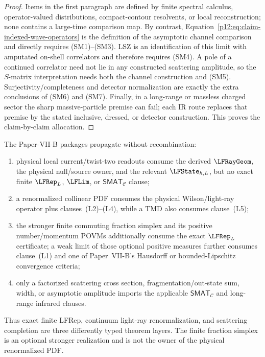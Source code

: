 \documentclass[12pt,a4paper]{article}
\begin{document}
\begin{proof}
Items in the first paragraph are defined by finite spectral calculus,
operator-valued distributions, compact-contour resolvents, or local
reconstruction; none contains a large-time comparison map.  By contrast,
Equation~\eqref{p12:eq:claim-indexed-wave-operators} is the definition of the
asymptotic channel comparison and directly requires \textnormal{(SM1)--(SM3)}.
LSZ is an identification of this limit with amputated on-shell correlators and
therefore requires \textnormal{(SM4)}.  A pole of a continued correlator need
not lie in any constructed scattering amplitude, so the \(S\)-matrix
interpretation needs both the channel construction and \textnormal{(SM5)}.
Surjectivity/completeness and detector normalization are exactly the extra
conclusions of \textnormal{(SM6)} and \textnormal{(SM7)}.  Finally, in a
long-range or massless charged sector the
sharp massive-particle premise can fail; each IR route replaces that premise by
the stated inclusive, dressed, or detector construction.  This proves the
claim-by-claim allocation.
\end{proof}

\begin{corollary}
\label{p12:cor:lf-ray-limit-scattering-split}
The Paper-VII-B packages propagate without recombination:
\begin{enumerate}[label=\textnormal{(\alph*)},leftmargin=2.4em]
\item physical local current/twist-two readouts consume the derived
      \(\LFRayGeom\), the physical null/source owner, and the relevant
      \(\LFState_{h,L}\), but no exact finite \(\LFRep_L\), \(\LFLim\), or
      \(\mathsf{SMAT}_{\mathcal C}\) clause;
\item a renormalized collinear PDF consumes the physical Wilson/light-ray
      operator plus clauses~\textnormal{(L2)--(L4)}, while a TMD also consumes
      clause~\textnormal{(L5)};
\item the stronger finite commuting fraction simplex and its positive
      number/momentum POVMs additionally consume the exact \(\LFRep_L\)
      certificate; a weak limit of those optional positive measures further
      consumes clause~\textnormal{(L1)} and one of Paper~VII-B's Hausdorff or
      bounded-Lipschitz convergence criteria;
\item only a factorized scattering cross section, fragmentation/out-state
      sum, width, or asymptotic amplitude imports the applicable
      \(\mathsf{SMAT}_{\mathcal C}\) and long-range infrared clauses.
\end{enumerate}
Thus exact finite LFRep, continuum light-ray renormalization, and scattering
completion are three differently typed theorem layers.  The finite fraction
simplex is an optional stronger realization and is not the owner of the
physical renormalized PDF.
\end{corollary}
\end{document}
